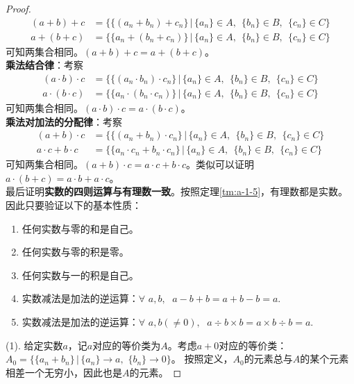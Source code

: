 \documentclass[12pt,UTF8]{ctexbook}
\begin{document}
\begin{appendix}
\begin{proof}
    \begin{align*}
        (a + b) + c &= \{\{(a_n + b_n) + c_n\} \, |\, \{a_n\}\in A,\;\,\{b_n\}\in B,\;\,\{c_n\}\in C \}  \\
        a + (b + c) &= \{\{a_n + (b_n + c_n)\} \, |\, \{a_n\}\in A,\;\,\{b_n\}\in B,\;\,\{c_n\}\in C \} 
    \end{align*}
    可知两集合相同。$(a + b) + c = a + (b + c)$。\\
    \textbf{乘法结合律}：考察
    \begin{align*}
        (a \cdot b) \cdot c &= \{\{(a_n \cdot b_n) \cdot c_n\} \, |\, \{a_n\}\in A,\;\,\{b_n\}\in B,\;\,\{c_n\}\in C \}  \\
        a \cdot (b \cdot c) &= \{\{a_n \cdot (b_n \cdot c_n)\} \, |\, \{a_n\}\in A,\;\,\{b_n\}\in B,\;\,\{c_n\}\in C \} 
    \end{align*}
    可知两集合相同。$(a \cdot b) \cdot c = a \cdot (b \cdot c)$。\\
    \textbf{乘法对加法的分配律}：考察
    \begin{align*}
        (a + b) \cdot c &= \{\{(a_n + b_n) \cdot c_n\} \, |\, \{a_n\}\in A,\;\,\{b_n\}\in B,\;\,\{c_n\}\in C \}  \\
        a \cdot c + b \cdot c &= \{\{a_n \cdot c_n + b_n \cdot c_n\} \, |\, \{a_n\}\in A,\;\,\{b_n\}\in B,\;\,\{c_n\}\in C \} 
    \end{align*}
    可知两集合相同。$(a + b) \cdot c = a \cdot c + b \cdot c$。类似可以证明$a \cdot (b + c) = a \cdot b + a \cdot c$。\\
    最后证明\textbf{实数的四则运算与有理数一致}。按照定理\ref{tm:a-1-5}，有理数都是实数。因此只要验证以下的基本性质：
    \begin{enumerate}
        \item 任何实数与零的和是自己。
        \item 任何实数与零的积是零。
        \item 任何实数与一的积是自己。
        \item 实数减法是加法的逆运算：$\forall \,\, a, b, \;\,\, a - b + b = a + b - b = a.$
        \item 实数减法是加法的逆运算：$\forall \,\, a, b(\neq 0), \;\,\, a \div b \times b = a\times b \div b = a.$
    \end{enumerate}
    (1). 给定实数$a$，记$a$对应的等价类为$A$。考虑$a+0$对应的等价类：$A_0 = \{ \{a_n + b_n\} \,|\, \{a_n\}\to a, \,\, \{b_n\} \to 0 \}$。
    按照定义，$A_0$的元素总与$A$的某个元素相差一个无穷小，因此也是$A$的元素。

\end{proof}
\end{appendix}
\end{document}
